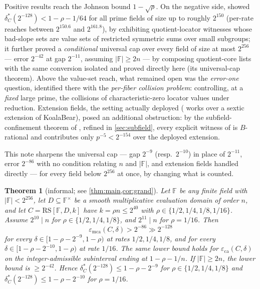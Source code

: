 \documentclass[11pt]{article}
\newtheorem{theorem}{Theorem}[section]
\theoremstyle{definition}
\theoremstyle{remark}
\newcommand{\F}{\mathbb{F}}
\newcommand{\B}{B}
\newcommand{\RS}{\mathrm{RS}}
\newcommand{\eca}{\varepsilon_{\mathrm{ca}}}
\newcommand{\emca}{\varepsilon_{\mathrm{mca}}}
\begin{document}
Positive results reach the Johnson bound $1-\sqrt\rho$. On the negative side, \cite{Cho26b} showed $\delta^*_C(2^{-128})<1-\rho-1/64$ for all prime fields of size up to roughly $2^{150}$ (per-rate reaches between $2^{150.6}$ and $2^{161.8}$), by exhibiting quotient-locator witnesses whose bad-slope sets are value sets of restricted symmetric sums over small subgroups; it further proved a \emph{conditional} universal cap over every field of size at most $2^{256}$ --- error $2^{-42}$ at gap $2^{-11}$, assuming $|\F|\ge2n$ --- by composing quotient-core lists with the same conversion isolated and proved directly here (its universal-cap theorem). Above the value-set reach, what remained open was the \emph{error-one} question, identified there with the \emph{per-fiber collision problem}: controlling, at a \emph{fixed} large prime, the collisions of characteristic-zero locator values under reduction. Extension fields, the setting actually deployed (\cite[\S6.3]{ABF26} works over a sextic extension of KoalaBear), posed an additional obstruction: by the subfield-confinement theorem of \cite{Cho26b}, refined in \cref{sec:subfield}, every explicit witness of \cite{Cho26a,Cho26b} is $\B$-rational and contributes only $p^{-5}<2^{-154}$ over the deployed extension.

This note sharpens the universal cap --- gap $2^{-9}$ (resp.\ $2^{-10}$) in place of $2^{-11}$, error $2^{-86}$ with no condition relating $n$ and $|\F|$, and extension fields handled directly --- for every field below $2^{256}$ at once, by changing what is counted.


\begin{theorem}[informal; see \cref{thm:main,cor:grand}]\label{thm:informal}
Let $\F$ be any finite field with $|\F|<2^{256}$, let $D\subseteq\F^\times$ be a smooth multiplicative evaluation domain of order $n$, and let $C=\RS[\F,D,k]$ have $k=\rho n\le2^{40}$ with $\rho\in\{1/2,1/4,1/8,1/16\}$. Assume $2^{10}\mid n$ for $\rho\in\{1/2,1/4,1/8\}$, and $2^{11}\mid n$ for $\rho=1/16$. Then
\[
\emca(C,\delta)>2^{-86}\gg2^{-128}
\]
for every $\delta\in[1-\rho-2^{-9},1-\rho)$ at rates $1/2,1/4,1/8$, and for every $\delta\in[1-\rho-2^{-10},1-\rho)$ at rate $1/16$. The same lower bound holds for $\eca(C,\delta)$ on the integer-admissible subinterval ending at $1-\rho-1/n$. If $|\F|\ge2n$, the lower bound is $\ge2^{-42}$. Hence $\delta^*_C(2^{-128})\le1-\rho-2^{-9}$ for $\rho\in\{1/2,1/4,1/8\}$ and $\delta^*_C(2^{-128})\le1-\rho-2^{-10}$ for $\rho=1/16$.
\end{theorem}
\end{document}

